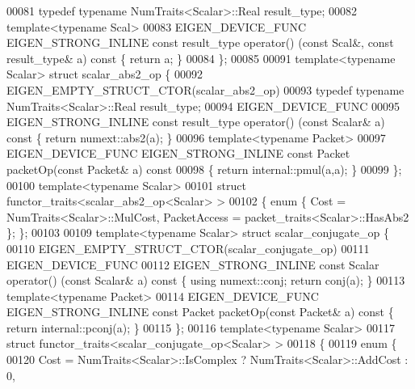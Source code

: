 \begin{DoxyCode}
00081   \textcolor{keyword}{typedef} \textcolor{keyword}{typename} NumTraits<Scalar>::Real result\_type;
00082   \textcolor{keyword}{template}<\textcolor{keyword}{typename} Scal>
00083   EIGEN\_DEVICE\_FUNC EIGEN\_STRONG\_INLINE \textcolor{keyword}{const} result\_type operator() (\textcolor{keyword}{const} Scal&, \textcolor{keyword}{const} result\_type& a)\textcolor{keyword}{
       const }\{ \textcolor{keywordflow}{return} a; \}
00084 \};
00085 
00091 \textcolor{keyword}{template}<\textcolor{keyword}{typename} Scalar> \textcolor{keyword}{struct }scalar\_abs2\_op \{
00092   EIGEN\_EMPTY\_STRUCT\_CTOR(scalar\_abs2\_op)
00093   \textcolor{keyword}{typedef} \textcolor{keyword}{typename} NumTraits<Scalar>::Real result\_type;
00094   EIGEN\_DEVICE\_FUNC
00095   EIGEN\_STRONG\_INLINE \textcolor{keyword}{const} result\_type operator() (\textcolor{keyword}{const} Scalar& a)\textcolor{keyword}{ const }\{ \textcolor{keywordflow}{return} numext::abs2(a); \}
00096   \textcolor{keyword}{template}<\textcolor{keyword}{typename} Packet>
00097   EIGEN\_DEVICE\_FUNC EIGEN\_STRONG\_INLINE \textcolor{keyword}{const} Packet packetOp(\textcolor{keyword}{const} Packet& a)\textcolor{keyword}{ const}
00098 \textcolor{keyword}{  }\{ \textcolor{keywordflow}{return} internal::pmul(a,a); \}
00099 \};
00100 \textcolor{keyword}{template}<\textcolor{keyword}{typename} Scalar>
00101 \textcolor{keyword}{struct }functor\_traits<scalar\_abs2\_op<Scalar> >
00102 \{ \textcolor{keyword}{enum} \{ Cost = NumTraits<Scalar>::MulCost, PacketAccess = packet\_traits<Scalar>::HasAbs2 \}; \};
00103 
00109 \textcolor{keyword}{template}<\textcolor{keyword}{typename} Scalar> \textcolor{keyword}{struct }scalar\_conjugate\_op \{
00110   EIGEN\_EMPTY\_STRUCT\_CTOR(scalar\_conjugate\_op)
00111   EIGEN\_DEVICE\_FUNC
00112   EIGEN\_STRONG\_INLINE \textcolor{keyword}{const} Scalar operator() (\textcolor{keyword}{const} Scalar& a)\textcolor{keyword}{ const }\{ \textcolor{keyword}{using} numext::conj; \textcolor{keywordflow}{return} conj(a);
       \}
00113   \textcolor{keyword}{template}<\textcolor{keyword}{typename} Packet>
00114   EIGEN\_DEVICE\_FUNC EIGEN\_STRONG\_INLINE \textcolor{keyword}{const} Packet packetOp(\textcolor{keyword}{const} Packet& a)\textcolor{keyword}{ const }\{ \textcolor{keywordflow}{return} 
      internal::pconj(a); \}
00115 \};
00116 \textcolor{keyword}{template}<\textcolor{keyword}{typename} Scalar>
00117 \textcolor{keyword}{struct }functor\_traits<scalar\_conjugate\_op<Scalar> >
00118 \{
00119   \textcolor{keyword}{enum} \{
00120     Cost = NumTraits<Scalar>::IsComplex ? NumTraits<Scalar>::AddCost : 0,

\end{DoxyCode}
